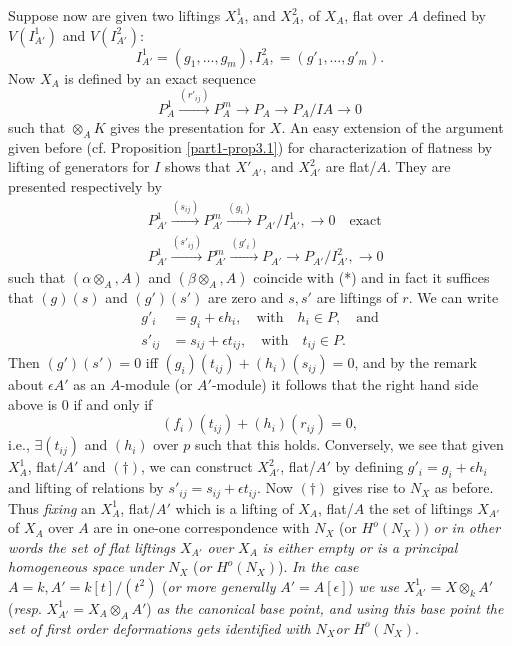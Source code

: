 {Suppose now are given two liftings $X^{1}_A$, and $X^{2}_A$, of $X_A$,
flat over $A$ defined by $V(I^{1}_{A'})$ and $V(I^{2}_{A'})$: 
$$
I^{1}_{A'}=(g_1,\ldots,g_m), I^{2}_A,=(g'_{1},\ldots,g'_{m}).
$$
Now $X_A$ is defined by an exact sequence
\begin{equation*}
P^{1}_A\xrightarrow{(r'_{ij})}P^{m}_A\to P_A \to P_A/IA\to 0\tag{*}
\end{equation*}
such that $\otimes_A K$ gives the presentation for $X$. An easy
extension of the argument given before
(cf. Proposition \ref{part1-prop3.1}) for characterization of flatness
by lifting of generators for $I$ shows that $X'_{A'}$, and
$X^{2}_{A'}$ are flat/$A$. They are presented respectively by 
\begin{align*}
&P^{1}_{A'}\xrightarrow{(s_{ij})}P^{m}_{A'}\xrightarrow{(g_i)}P_{A'}/I^{1}_{A'},\to
0\quad\text{exact}\tag{$\alpha$}\\ 
&P^{1}_{A'}\xrightarrow{(s'_{ij})}P^{m}_{A'}\xrightarrow{(g'_i)}P_{A'}\to
P_{A'}/I^{2}_{A'},\to 0\tag{$\beta$} 
\end{align*}\pageoriginale
such that $(\alpha \otimes_A, A)$ and $(\beta \otimes_A, A)$ coincide
with (*) and in fact it suffices that $(g)(s)$ and $(g')(s')$ are zero
and $s, s'$ are liftings of $r$. We can write 
\begin{align*}
g'_i&=g_i+\epsilon h_i,\quad\text{with}\quad h_i \in P,\quad \text{and}\\
s'_{ij}&=s_{ij}+\epsilon t_{ij},\quad\text{with}\quad t_{ij}\in P.
\end{align*}
Then $(g')(s')=0$ iff $(g_i)(t_{ij})+(h_i)(s_{ij})=0$, and by the
remark about $\epsilon A'$ as an $A$-module (or $A'$-module) it
follows that the right hand side above is $0$ if and only if 
\begin{equation*}
(f_i)(t_{ij})+(h_i)(r_{ij})=0,\tag{$\dagger$}
\end{equation*}
 i.e., $\exists (t_{ij})$ and $(h_i)$ over $p$ such that this
 holds. Conversely, we see that given $X^{1}_A$, flat/$A'$ and
 $(\dagger)$, we can construct $X^{2}_{A'}$, flat/$A'$ by defining
 $g'_i=g_i+\epsilon h_i$ and lifting of relations by
 $s'_{ij}=s_{ij}+\epsilon t_{ij}$. Now $(\dagger)$ gives rise to $N_X$
 as before. Thus {\em fixing} an $X^{1}_A$, flat/$A'$ which is a
 lifting of $X_A$, flat/$A$ the set of liftings $X_{A'}$ of $X_A$ over
 $A$ are in one-one correspondence with $N_X$ (or $H^{o}(N_X))$ {\em
 or in other words the set of flat liftings} $X_{A'}$ {\em over} $X_A$
 {\em is either empty or is a principal homogeneous space under} $N_X$
 ({\em or} $H^{o}(N_X)$). {\em In the case} $A=k, A'=k[t]/(t^{2})$
 ({\em or more generally} $A'=A[\epsilon]$) {\em we use}
 $X^{1}_{A'}=X\otimes_k A'$ ({\em resp}. $X^{1}_{A'}=X_A\otimes_A A'$)
 {\em as the canonical base point, and using this base point the set
 of first order deformations gets identified with} $N_X${\em or}
 $H^{o}(N_X)$. 

}
